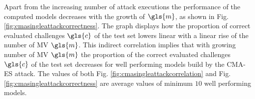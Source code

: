 Apart from the increasing number of attack executions the performance of the computed models decreases with the growth of $\gls{m}$, as shown in Fig. \ref{fig:cmasingleattackcorrectness}.
The graph displays how the proportion of correct evaluated challenges $\gls{c}$ of the test set lowers linear with a linear rise of the number of \ac{MV} $\gls{m}$.
This indirect correlation implies that with growing number of \ac{MV} $\gls{m}$ the proportion of the correct evaluated challenges $\gls{c}$ of the test set decreases for well performing models build by the \ac{CMA-ES} attack.
The values of both Fig. \ref{fig:cmasingleattackcorrelation} and Fig. \ref{fig:cmasingleattackcorrectness} are average values of minimum $10$ well performing models.


